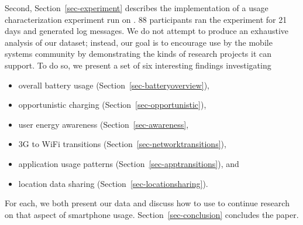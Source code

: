

Second, Section~\ref{sec-experiment} describes the implementation of a usage
characterization experiment run on \PhoneLab{}. 88 participants ran the
experiment for 21 days and generated  log messages. We do not
attempt to produce an exhaustive analysis of our dataset; instead, our goal
is to encourage \PhoneLab{} use by the mobile systems community by
demonstrating the kinds of research projects it can support. To do so, we
present a set of six interesting findings investigating

\begin{itemize}[nosep]
\item overall battery usage (Section~\ref{sec-batteryoverview}),
\item opportunistic charging (Section~\ref{sec-opportunistic}),
\item user energy awareness (Section~\ref{sec-awareness},
\item 3G to WiFi transitions (Section~\ref{sec-networktransitions}),
\item application usage patterns (Section~\ref{sec-apptransitions}), and
\item location data sharing (Section~\ref{sec-locationsharing}).
\end{itemize}

For each, we both present our data and
discuss how to use \PhoneLab{} to continue research on that aspect of
smartphone usage. Section~\ref{sec-conclusion} concludes the paper.
